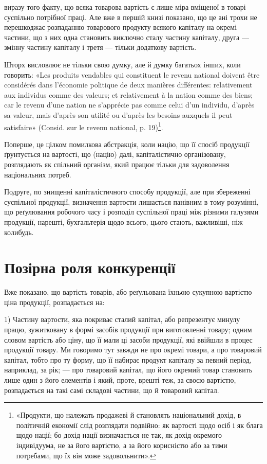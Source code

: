 \parcont{}  %
виразу того факту, що всяка товарова вартість є лише міра вміщеної в товарі
суспільно потрібної праці. Але вже в першій книзі показано, що це ані трохи
не перешкоджає розпаданню товарового продукту всякого капіталу на окремі
частини, що з них одна становить виключно сталу частину капіталу, друга —
змінну частину капіталу і третя — тільки додаткову вартість.

Шторх висловлює не тільки свою думку, але й думку багатьох інших,
коли говорить: «Les produits vendables qui constituent le revenu national doivent
être considérés dans l’économie politique de deux manières différentes: relativement aux
individus comme des valeurs; et relativement à la nation comme des biens; car le
revenu d’une nation ne s’apprécie pas comme celui d’un individu, d’après sa valeur,
mais d’après son utilité ou d’après les besoins auxquels il peut satisfaire» (Consid.
sur le revenu national, p. 19)\footnote*{
«Продукти, що належать продажеві й становлять національний дохід, в політичній економії слід
розглядати подвійно: як вартості щодо осіб і як блага щодо нації; бо дохід нації визначається не
так, як дохід окремого індивідуума, не за його вартістю, а за його корисністю або за тими потребами,
що їх він може задовольнити».
}.

Поперше, це цілком помилкова абстракція, коли націю, що її спосіб продукції
ґрунтується на вартості, що (націю) далі, капіталістично організовану,
розглядають як спільний організм, який працює тільки для задоволення національних
потреб.

Подруге, по знищенні капіталістичного способу продукції, але при збереженні
суспільної продукції, визначення вартости лишається панівним в тому
розумінні, що реґулювання робочого часу і розподіл суспільної праці між різними
галузями продукції, нарешті, бухгальтерія щодо всього, цього стають,
важливіші, ніж колибудь.

\section{Позірна роля конкуренції}

Вже показано, що вартість товарів, або реґульована їхньою сукупною вартістю
ціна продукції, розпадається на:

1) Частину вартости, яка покриває сталий капітал, або репрезентує минулу
працю, зужитковану в формі засобів продукції при виготовленні товару; одним
словом вартість або ціну, що її мали ці засоби продукції, які ввійшли в процес
продукції товару. Ми говоримо тут завжди не про окремі товари, а про товаровий
капітал, тобто про ту форму, що її набирає продукт капіталу за певний
період, наприклад, за рік; — про товаровий капітал, що його окремий товар
становить лише один з його елементів і який, проте, врешті теж, за своєю
вартістю, розпадається на такі самі складові частини, що й товаровий капітал.

